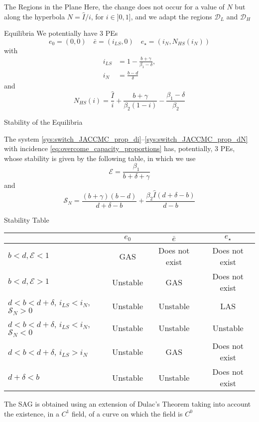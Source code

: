 \documentclass[aspectratio=169]{beamer}\usepackage[]{graphicx}\usepackage[]{xcolor}
\begin{document}
\begin{frame}{The Regions in the Plane}
\bbullet Here, the change does not occur for a value of $N$ but along the hyperbola $N=\hat{I}/i$, for $i\in]0,1]$, and we adapt the regions $\mathcal{D}_L$ and $\mathcal{D}_H$
\end{frame}

\begin{frame}{Equilibria}
\bbullet We potentially have 3 PEs
\[
e_0=(0,0)\quad \bar{e}=(i_{LS},0)\quad e_{\star}=(i_N,N_{HS}(i_N))
\]
with
\begin{align}
i_{LS}&=1-\frac{b+\gamma}{\beta_1-\delta}, \\
i_N&=\frac{b-d}{\delta}
\end{align}
and
\[
N_{HS}(i) = \frac{\hat{I}}{i}+\frac{b+\gamma}{\beta_2(1-i)}
-\frac{\beta_1-\delta}{\beta_2}
\]
\end{frame}

\begin{frame}{Stability of the Equilibria}
\begin{theorem}
The system \eqref{sys:switch_JACCMC_prop_di}--\eqref{sys:switch_JACCMC_prop_dN} with incidence \eqref{eq:overcome_capacity_proportions} has, potentially, 3 PEs, whose stability is given by the following table, in which we use
\[
\mathcal{E}=\frac{\beta_1}{b+\delta+\gamma}
\]
and 
\[
\mathcal{S}_N=
\frac{(b+\gamma)(b-d)}{d+\delta-b}
+\frac{\beta_2\hat{I}(d+\delta-b)}{d-b}
\]
\end{theorem}
\end{frame}

\begin{frame}{Stability Table}
\begin{center}
\begin{tabular}{|l|c|c|c|}
\hline
& $e_0$ & $\bar{e}$ & $e_{\star}$ \\
\hline
$b<d,\mathcal{E}<1$ & GAS & Does not exist & Does not exist \\
\hline
$b<d,\mathcal{E}>1$ & Unstable & GAS & Does not exist \\
\hline
$d<b<d+\delta$, $i_{LS}<i_N$, $\mathcal{S}_N>0$ & Unstable & Unstable & LAS \\
\hline
$d<b<d+\delta$, $i_{LS}<i_N$, $\mathcal{S}_N<0$ & Unstable & Unstable & Unstable \\
\hline
$d<b<d+\delta$, $i_{LS}>i_N$ & Unstable & GAS & Does not exist \\
\hline
$d+\delta<b$ & Unstable & Unstable & Does not exist \\
\hline
\end{tabular}
\end{center}

\bbullet The SAG is obtained using an extension of Dulac's Theorem taking into account the existence, in a $C^1$ field, of a curve on which the field is $C^0$
\end{frame}
\end{document}
